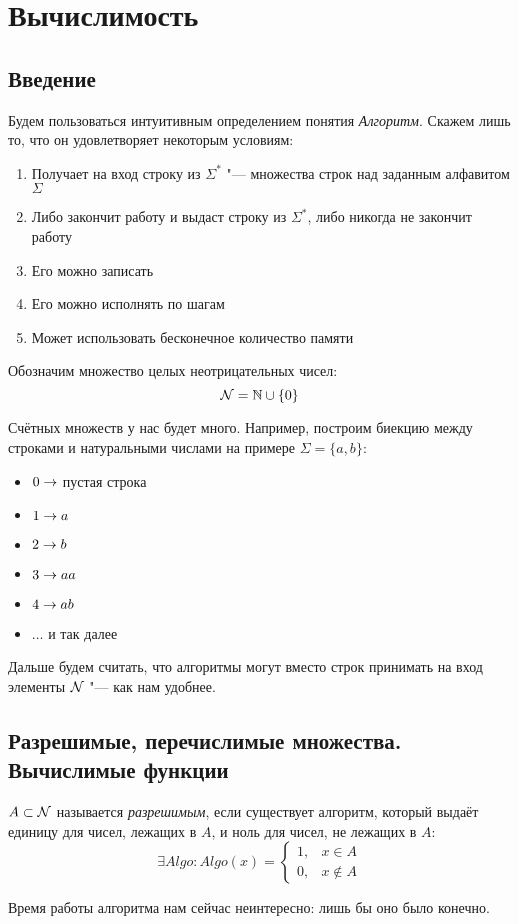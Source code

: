 \chapter{Вычислимость}
\section{Введение}
Будем пользоваться интуитивным определением понятия \textit{Алгоритм}.
Скажем лишь то, что он удовлетворяет некоторым условиям:
\begin{enumerate}
    \item Получает на вход строку из $\Sigma^*$ "--- множества строк над заданным алфавитом $\Sigma$
    \item Либо закончит работу и выдаст строку из $\Sigma^*$, либо никогда не закончит работу
    \item Его можно записать
    \item Его можно исполнять по шагам
    \item Может использовать бесконечное количество памяти
\end{enumerate}

\begin{Def}
	Обозначим множество целых неотрицательных чисел:
	\[ \mathcal{N} = \mathbb{N} \cup \{ 0 \} \]
\end{Def}

Счётных множеств у нас будет много.
Например, построим биекцию между строками и натуральными числами на примере $\Sigma = \{a, b\}$:
\begin{itemize}
\item $0 \rightarrow$ пустая строка
\item $1\rightarrow a$
\item $2\rightarrow b$
\item $3\rightarrow aa$
\item $4\rightarrow ab$
\item $\dots$ и так далее
\end{itemize}
Дальше будем считать, что алгоритмы могут вместо строк принимать на вход элементы $\mathcal{N}$ "--- как нам удобнее.

\section{Разрешимые, перечислимые множества. Вычислимые функции}

\begin{Def}
	$A \subset \mathcal{N}$ называется \textit{разрешимым}, если существует алгоритм, который выдаёт единицу для чисел, лежащих в $A$, и ноль для чисел, не лежащих в $A$:
	\[ \exists Algo \colon Algo(x) =
	\begin{cases}
		1, &x \in A \\
		0, &x \notin A
	\end{cases}
	\]
\end{Def}
\begin{Rem}
	Время работы алгоритма нам сейчас неинтересно: лишь бы оно было конечно.
\end{Rem}

